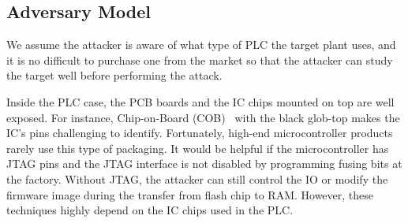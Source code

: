 %
%
%
%
%
\subsection{Adversary Model}

We assume the attacker is aware of what type of PLC the target plant uses, and it is no difficult to purchase one from the market so that the attacker can study the target well before performing the attack.

Inside the PLC case, the PCB boards and the IC chips mounted on top are well exposed. For instance, Chip-on-Board (COB)~\cite{lau1994chip} with the black glob-top makes the IC's pins challenging to identify. Fortunately, high-end microcontroller products rarely use this type of packaging. It would be helpful if the microcontroller has JTAG pins and the JTAG interface is not disabled by programming fusing bits at the factory. Without JTAG, the attacker can still control the IO or modify the firmware image during the transfer from flash chip to RAM. However, these techniques highly depend on the IC chips used in the PLC.

